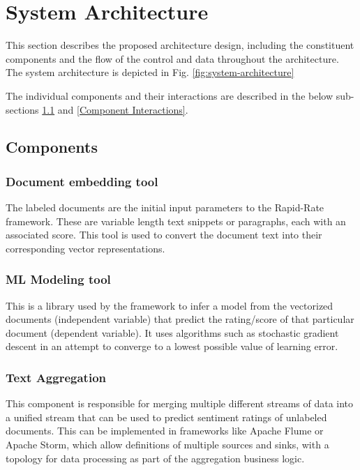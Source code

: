 \documentclass[conference]{IEEEtran}
\begin{document}
\vspace{5mm}

\section{System Architecture}
    This section describes the proposed architecture design, including the constituent components and the flow of the control and data throughout the architecture.
    The system architecture is depicted in Fig. \ref{fig:system-architecture}

    The individual components and their interactions are described in the below sub-sections \ref{Components} and \ref{Component Interactions}.

    \subsection{Components} \label{Components}

        \subsubsection{Document embedding tool}
            The labeled documents are the initial input parameters to the Rapid-Rate framework. 
            These are variable length text snippets or paragraphs, each with an associated score. 
            This tool is used to convert the document text into their corresponding vector representations.

        \subsubsection{ML Modeling tool}
            This is a library used by the framework to infer a model from the vectorized documents (independent variable) that predict the rating/score of that particular document (dependent variable). 
            It uses algorithms such as stochastic gradient descent in an attempt to converge to a lowest possible value of learning error\cite{bottou2010large}. 

        \subsubsection{Text Aggregation}
            This component is responsible for merging multiple different streams of data into a unified stream that can be used to predict sentiment ratings of unlabeled documents. 
            This can be implemented in frameworks like Apache Flume or Apache Storm, which allow definitions of multiple sources and sinks, with a topology for data processing as part of the aggregation business logic.
\end{document}
